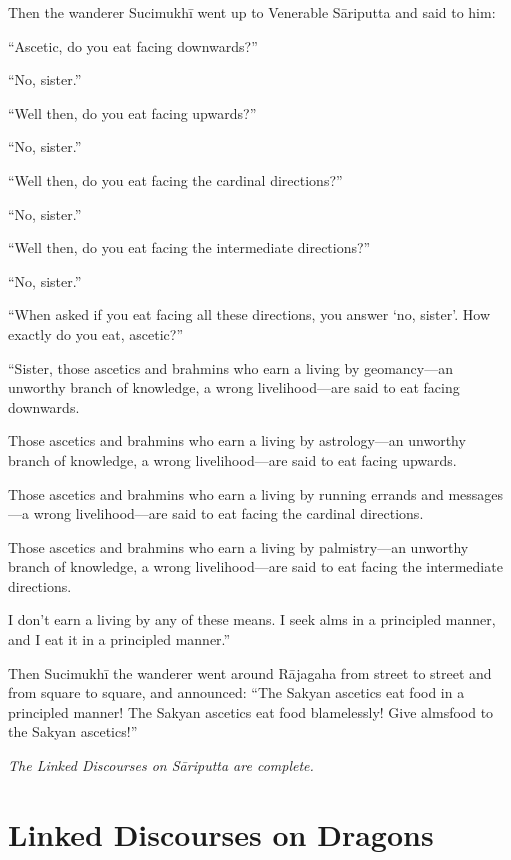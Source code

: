 \documentclass[12pt,openany]{book}%
\let\oldcontentsline\contentsline
\newcommand{\nopagecontentsline}[3]{\oldcontentsline{#1}{#2}{}}
\newcommand*{\scendsutta}[1]{\begin{center}\textit{#1}\end{center}}
\begin{document}
Then the wanderer \textsanskrit{Sucimukhī} went up to Venerable \textsanskrit{Sāriputta} and said to him: 

“Ascetic, do you eat facing downwards?” 

“No, sister.” 

“Well then, do you eat facing upwards?” 

“No, sister.” 

“Well then, do you eat facing the cardinal directions?” 

“No, sister.” 

“Well then, do you eat facing the intermediate directions?” 

“No, sister.” 

“When asked if you eat facing all these directions, you answer ‘no, sister’. How exactly do you eat, ascetic?” 

“Sister, those ascetics and brahmins who earn a living by geomancy—an unworthy branch of knowledge, a wrong livelihood—are said to eat facing downwards. 

Those ascetics and brahmins who earn a living by astrology—an unworthy branch of knowledge, a wrong livelihood—are said to eat facing upwards. 

Those ascetics and brahmins who earn a living by running errands and messages—a wrong livelihood—are said to eat facing the cardinal directions. 

Those ascetics and brahmins who earn a living by palmistry—an unworthy branch of knowledge, a wrong livelihood—are said to eat facing the intermediate directions. 

I don’t earn a living by any of these means. I seek alms in a principled manner, and I eat it in a principled manner.” 

Then \textsanskrit{Sucimukhī} the wanderer went around \textsanskrit{Rājagaha} from street to street and from square to square, and announced: “The Sakyan ascetics eat food in a principled manner! The Sakyan ascetics eat food blamelessly! Give almsfood to the Sakyan ascetics!” 

\scendsutta{The Linked Discourses on \textsanskrit{Sāriputta} are complete. }

%
\part*{Linked Discourses on Dragons}
\markboth{}{}
\addtocontents{toc}{\let\protect\contentsline\protect\oldcontentsline}
\end{document}
